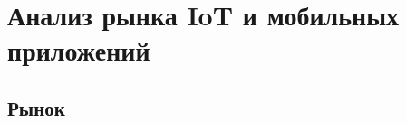 \section{Анализ рынка IoT и мобильных приложений}
\label{sec:analysis}

\subsection{Рынок}
\label{sec:analysis:model}


